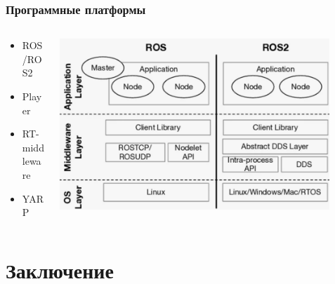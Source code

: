 \documentclass{../../slides-style}
\begin{document}
    \begin{frame}
        \frametitle{Программные платформы}
        \begin{columns}
            \begin{column}{0.4\textwidth}
                \begin{itemize}
                    \item ROS/ROS2
                    \item Player
                    \item RT-middleware
                    \item YARP
                \end{itemize}
            \end{column}
            \begin{column}{0.6\textwidth}
                \begin{center}
                    \includegraphics[width=0.9\textwidth]{ros.png}
                \end{center}
            \end{column}
        \end{columns}
    \end{frame}

    \section{Заключение}
\end{document}
